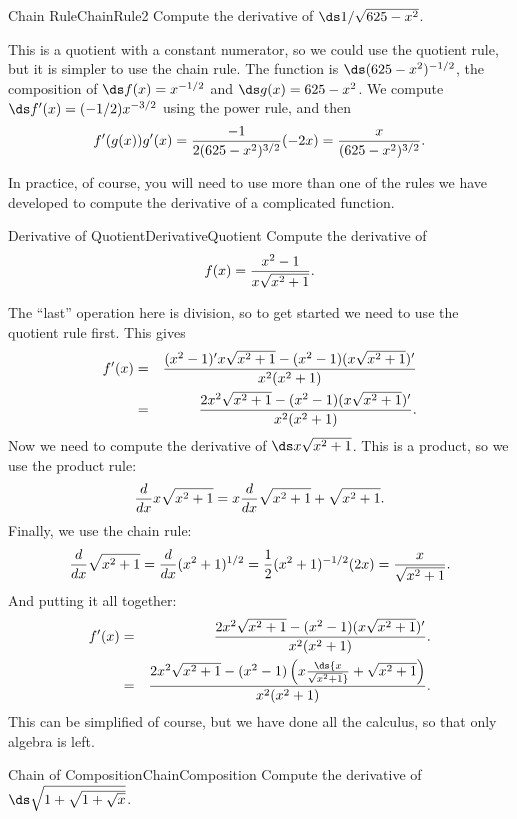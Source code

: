 \begin{example}{Chain Rule}{ChainRule2}
Compute the derivative of $\ds 1/\sqrt{625-x^2}$.
\end{example}

\begin{solution} 
This is a quotient with
a constant numerator, so we could use the quotient rule, but it is
simpler to use the chain rule. The function is $\ds (625-x^2)^{-1/2}$, the
composition of $\ds f(x)=x^{-1/2}$ and $\ds g(x)=625-x^2$. We compute
$\ds f'(x)=(-1/2)x^{-3/2}$ using the power rule, and then
$$f'(g(x))g'(x)={-1\over 2(625-x^2)^{3/2}}(-2x)={x\over (625-x^2)^{3/2}}.$$
\end{solution}

In practice, of course, you will need to use more than one of the
rules we have developed to compute the derivative of a complicated
function.

\begin{example}{Derivative of Quotient}{DerivativeQuotient}
Compute the derivative of $$f(x)={x^2-1\over x\sqrt{x^2+1}}.$$
\vspace{-0.5cm}
\end{example}

\begin{solution} 
The ``last'' operation here is division, so to get started we need to
use the quotient rule first. This gives
\begin{eqnarray*}
f'(x)&=&{(x^2-1)'x\sqrt{x^2+1}-(x^2-1)(x\sqrt{x^2+1})'\over
x^2(x^2+1)}\cr
&=&{2x^2\sqrt{x^2+1}-(x^2-1)(x\sqrt{x^2+1})'\over
x^2(x^2+1)}.\cr
\end{eqnarray*}
Now we need to compute the derivative of $\ds x\sqrt{x^2+1}$. This is a
product, so we use the product rule:
$${d\over dx}x\sqrt{x^2+1}=x{d\over dx}\sqrt{x^2+1}+\sqrt{x^2+1}.$$
Finally, we use the chain rule:
$${d\over dx}\sqrt{x^2+1}={d\over dx}(x^2+1)^{1/2}=
{1\over 2}(x^2+1)^{-1/2}(2x)={x\over \sqrt{x^2+1}}.$$
And putting it all together:
\begin{eqnarray*}
f'(x)&=&{2x^2\sqrt{x^2+1}-(x^2-1)(x\sqrt{x^2+1})'\over
x^2(x^2+1)}.\cr
&=&{2x^2\sqrt{x^2+1}-(x^2-1)\left(x{\ds{x\over \sqrt{x^2+1}}}
+\sqrt{x^2+1}\right)\over
x^2(x^2+1)}.\cr
\end{eqnarray*}
This can be simplified of course, but we have done all the calculus,
so that only algebra is left.
\end{solution}

\begin{example}{Chain of Composition}{ChainComposition}
Compute the derivative of $\ds \sqrt{1+\sqrt{1+\sqrt{x}}}$. 
\end{example}

